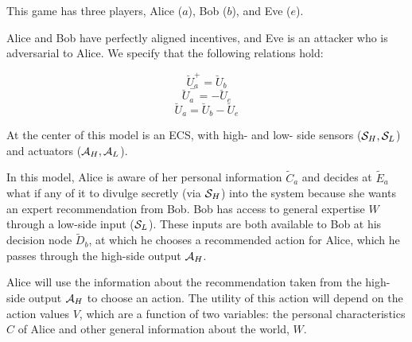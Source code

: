 \documentclass[../thesis.tex]{subfiles}
\begin{document}
\begin{center}
\end{center}

This game has three players, Alice ($a$), Bob ($b$),
and Eve ($e$).

Alice and Bob have perfectly aligned incentives,
and Eve is an attacker who is adversarial to
Alice.
We specify that the following relations hold:

$$\breve{U}^+_a = \breve{U}_b$$
$$\breve{U}^-_a = -\breve{U}_e$$
$$\breve{U}_a = \breve{U}_b - \breve{U}_e$$

At the center of this model is an ECS,
with high- and low- side sensors ($\mathcal{S}_H, \mathcal{S}_L$)
and actuators ($\mathcal{A}_H, \mathcal{A}_L$).

In this model, Alice is aware of her
personal information $\tilde{C}_a$ and decides at
$\tilde{E}_a$ what if any of it to divulge
secretly (via $\mathcal{S}_H$)
into the system because she wants an expert recommendation
from Bob.
Bob has access to general expertise $W$ through
a low-side input ($\mathcal{S}_L$).
These inputs are both available to Bob at his
decision node $\tilde{D}_b$, at which he chooses a
recommended action for Alice, which he passes through
the high-side output $\mathcal{A}_H$.

Alice will use the information about the recommendation
taken from the high-side output $\mathcal{A}_H$ to choose
an action.
The utility of this action will depend on the
action values $V$, which are a function of two
variables: the personal characteristics $C$ of Alice
and other general information about the world, $W$.
\end{document}
